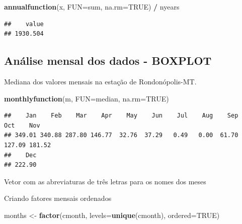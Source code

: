 \documentclass[
]{book}
\newenvironment{Shaded}{\begin{snugshade}}{\end{snugshade}}
\newcommand{\DataTypeTok}[1]{\textcolor[rgb]{0.13,0.29,0.53}{#1}}
\newcommand{\KeywordTok}[1]{\textcolor[rgb]{0.13,0.29,0.53}{\textbf{#1}}}
\newcommand{\NormalTok}[1]{#1}
\newcommand{\OperatorTok}[1]{\textcolor[rgb]{0.81,0.36,0.00}{\textbf{#1}}}
\newcommand{\OtherTok}[1]{\textcolor[rgb]{0.56,0.35,0.01}{#1}}
\newcommand{\StringTok}[1]{\textcolor[rgb]{0.31,0.60,0.02}{#1}}
\begin{document}
\begin{Shaded}
\begin{Highlighting}[]
\KeywordTok{annualfunction}\NormalTok{(x, }\DataTypeTok{FUN=}\NormalTok{sum, }\DataTypeTok{na.rm=}\OtherTok{TRUE}\NormalTok{) }\OperatorTok{/}\StringTok{ }\NormalTok{nyears}
\end{Highlighting}
\end{Shaded}

\begin{verbatim}
##    value 
## 1930.504
\end{verbatim}

\hypertarget{anuxe1lise-mensal-dos-dados---boxplot}{%
\subsection{Análise mensal dos dados - BOXPLOT}\label{anuxe1lise-mensal-dos-dados---boxplot}}

Mediana dos valores mensais na estação de Rondonópolis-MT.

\begin{Shaded}
\begin{Highlighting}[]
\KeywordTok{monthlyfunction}\NormalTok{(m, }\DataTypeTok{FUN=}\NormalTok{median, }\DataTypeTok{na.rm=}\OtherTok{TRUE}\NormalTok{)}
\end{Highlighting}
\end{Shaded}

\begin{verbatim}
##    Jan    Feb    Mar    Apr    May    Jun    Jul    Aug    Sep    Oct    Nov 
## 349.01 340.88 287.80 146.77  32.76  37.29   0.49   0.00  61.70 127.09 181.52 
##    Dec 
## 222.90
\end{verbatim}

Vetor com as abreviaturas de três letras para os nomes dos meses

\begin{Shaded}
\end{Shaded}

Criando fatores mensais ordenados

\begin{Shaded}
\begin{Highlighting}[]
\NormalTok{months <-}\StringTok{ }\KeywordTok{factor}\NormalTok{(cmonth, }\DataTypeTok{levels=}\KeywordTok{unique}\NormalTok{(cmonth), }\DataTypeTok{ordered=}\OtherTok{TRUE}\NormalTok{)}
\end{Highlighting}
\end{Shaded}
\end{document}
